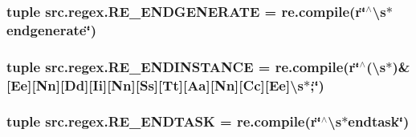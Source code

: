 \hypertarget{namespacesrc_1_1regex_a768cea115f18317f98fa08f037639c82}{
\subsubsection[{R\-E\-\_\-\-E\-N\-D\-G\-E\-N\-E\-R\-A\-T\-E}]{\setlength{\rightskip}{0pt plus 5cm}tuple src.\-regex.\-R\-E\-\_\-\-E\-N\-D\-G\-E\-N\-E\-R\-A\-T\-E = re.\-compile(r\char`\"{}$^\wedge$\textbackslash{}s$\ast$endgenerate\char`\"{})}}\label{namespacesrc_1_1regex_a768cea115f18317f98fa08f037639c82}
\hypertarget{namespacesrc_1_1regex_ae5372020720a2ffcc15374e77c477790}{
\subsubsection[{R\-E\-\_\-\-E\-N\-D\-I\-N\-S\-T\-A\-N\-C\-E}]{\setlength{\rightskip}{0pt plus 5cm}tuple src.\-regex.\-R\-E\-\_\-\-E\-N\-D\-I\-N\-S\-T\-A\-N\-C\-E = re.\-compile(r\char`\"{}$^\wedge$(\textbackslash{}s$\ast$)\&\mbox{[}Ee\mbox{]}\mbox{[}Nn\mbox{]}\mbox{[}Dd\mbox{]}\mbox{[}Ii\mbox{]}\mbox{[}Nn\mbox{]}\mbox{[}Ss\mbox{]}\mbox{[}Tt\mbox{]}\mbox{[}Aa\mbox{]}\mbox{[}Nn\mbox{]}\mbox{[}Cc\mbox{]}\mbox{[}Ee\mbox{]}\textbackslash{}s$\ast$;\char`\"{})}}\label{namespacesrc_1_1regex_ae5372020720a2ffcc15374e77c477790}
\hypertarget{namespacesrc_1_1regex_a902a7f2eb802dd9f415f07bfb51dce2e}{
\subsubsection[{R\-E\-\_\-\-E\-N\-D\-T\-A\-S\-K}]{\setlength{\rightskip}{0pt plus 5cm}tuple src.\-regex.\-R\-E\-\_\-\-E\-N\-D\-T\-A\-S\-K = re.\-compile(r\char`\"{}$^\wedge$\textbackslash{}s$\ast$endtask\char`\"{})}}\label{namespacesrc_1_1regex_a902a7f2eb802dd9f415f07bfb51dce2e}
